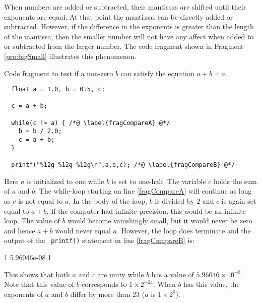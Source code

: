 When numbers are added or subtracted, their mantissas are shifted
until their exponents are equal.  At that point the mantissas can be
directly added or subtracted.  However, if the difference in the
exponents is greater than the length of the mantissa, then the smaller
number will not have any affect when added to or subtracted from the
larger number.  The code fragment shown in Fragment \ref{pro:bigSmall}
illustrates this phenomenon.
\begin{fragment}
Code fragment to test if a non-zero $b$ can satisfy the equation
$a+b=a$. \label{pro:bigSmall}
\codemiddle
\begin{lstlisting}
  float a = 1.0, b = 0.5, c;

  c = a + b;

  while(c != a) { /*@ \label{fragCompareA} @*/
    b = b / 2.0;
    c = a + b;
  }

  printf("%12g %12g %12g\n",a,b,c); /*@ \label{fragCompareB} @*/
\end{lstlisting}
\end{fragment}
Here $a$ is initialized to one while $b$ is set to one-half.  The
variable $c$ holds the sum of $a$ and $b$.  The while-loop starting on
line \ref{fragCompareA} will continue as long as $c$ is not equal to
$a$.  In the body of the loop, $b$ is divided by $2$ and $c$ is again
set equal to $a+b$.  If the computer had infinite precision, this
would be an infinite loop.  The value of $b$ would become vanishingly
small, but it would never be zero and hence $a+b$ would never equal
$a$.  However, the loop does terminate and the output of the {\tt
printf()} statement in line \ref{fragCompareB} is:
\begin{code}
           1   5.96046e-08   1
\end{code}
This shows that both $a$ and $c$ are unity while $b$ has a value of 
$5.96046\times10^{-8}$.  Note that this value of $b$ corresponds to
$1\times 2^{-24}$.  When $b$ has this value, the exponents of $a$ and $b$
differ by more than $23$ ($a$ is $1\times 2^0$).

